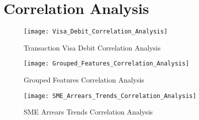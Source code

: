 
\chapter{Correlation Analysis} %

\label{AppendixB} %



\begin{figure}[H]
	\texttt{[image: Visa\_Debit\_Correlation\_Analysis]}
	\caption[Transaction Visa Debit Correlation Analysis]
	{Transaction Visa Debit Correlation Analysis}
	\label{fig:Transaction_Visa_Debit_Correlation_Analysis}
\end{figure}

\begin{figure}[H]
	\texttt{[image: Grouped\_Features\_Correlation\_Analysis]}
	\caption[Grouped Features Correlation Analysis]
	{Grouped Features Correlation Analysis}
	\label{fig:Grouped_Features_Correlation_Analysis}
\end{figure}

\begin{figure}[H]
	\texttt{[image: SME\_Arrears\_Trends\_Correlation\_Analysis]}
	\caption[SME Arrears Trends Correlation Analysis]
	{SME Arrears Trends Correlation Analysis}
	\label{fig:SME_Arrears_Trends_Correlation_Analysis}
\end{figure}